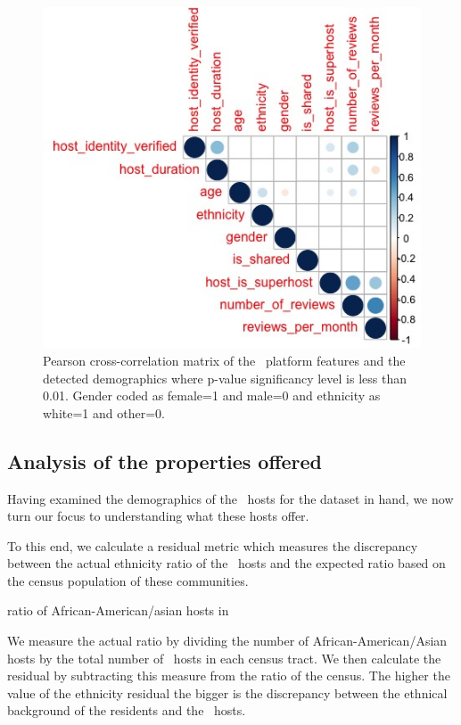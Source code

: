  
\begin{figure}[h]
\begin{center}
\includegraphics[scale=0.5]{pics/corplot.jpeg}
\caption{ Pearson cross-correlation matrix of the \ab \ platform features and the detected demographics where p-value significancy level is less than 0.01. Gender coded as female=1 and male=0 and ethnicity as white=1 and other=0. }
\label{fig:correlation}
\end{center}
\end{figure}


\subsection{Analysis of the properties offered }

Having examined the demographics of the \ab \ hosts for the dataset in hand, we now turn our focus to understanding what these hosts offer.   %

To this end, we calculate a residual metric which measures the discrepancy between the actual ethnicity ratio of the \ab \ hosts and the expected ratio based on the census population of these communities.

ratio of African-American/asian hosts in \ab \ 

We measure the actual ratio by dividing the number of African-American/Asian hosts by the total number of \ab \  hosts in each census tract.
We then calculate the residual by subtracting this measure from the ratio of  the census.
The higher the value of the ethnicity residual the bigger is the discrepancy between the ethnical background of the residents and the \ab \  hosts.
 
